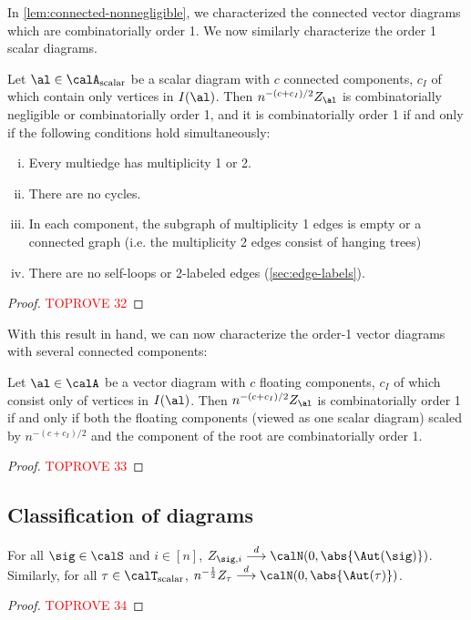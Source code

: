 \documentclass[12pt]{article}
\newcommand{\scalar}{\textnormal{scalar}}
\begin{document}
In \cref{lem:connected-nonnegligible}, we characterized the connected vector diagrams which are combinatorially order 1.
We now similarly characterize the order 1 scalar diagrams.
\begin{lemma}\label{lem:scalar-nonnegligible}
    Let $\al \in \calA_{\scalar}$ be a scalar diagram with $c$ connected components, $c_I$ of which contain only vertices in $I(\al)$.
Then 
$n^{-(c+c_I)/2}Z_\al$ is combinatorially negligible or combinatorially order 1, and it is combinatorially order 1 if and only if the following conditions hold simultaneously:
\begin{enumerate}[(i)]
    \item Every multiedge has multiplicity 1 or 2.
    \item There are no cycles.
    \item In each component, the subgraph of multiplicity 1 edges is empty or a connected graph
    (i.e. the multiplicity 2 edges consist of hanging trees)
    \item There are no self-loops or 2-labeled edges (\cref{sec:edge-labels}).
\end{enumerate}
\end{lemma}
\begin{proof}\textcolor{red}{TOPROVE 32}\end{proof}

With this result in hand, we can now characterize the order-1 vector diagrams with several connected components:

\begin{corollary}\label{cor:classify-full}
    Let $\al \in \calA$ be a vector diagram with $c$ floating components, $c_I$
of which consist only of vertices in $I(\al)$. Then $n^{-(c+c_I)/2}Z_\al$ is combinatorially order 1 if and only if both the floating components (viewed as one scalar diagram) scaled by $n^{-(c+c_I)/2}$ and the component of the root are combinatorially order 1.
\end{corollary}
\begin{proof}\textcolor{red}{TOPROVE 33}\end{proof} 
\subsection{Classification of diagrams}
\label{sec:diagram-classification-proof}

\begin{lemma}\label{lem:Ztau-normal}
    For all $\sig \in \calS$ and $i\in [n]$, $Z_{\sig, i} \overset{d}{\longrightarrow} \calN(0, \abs{\Aut(\sig)})$. Similarly, for all $\tau\in\calT_{\scalar}$, $n^{-\frac 1 2} Z_\tau\overset{d}{\longrightarrow} \calN(0, \abs{\Aut(\tau)})$.
\end{lemma}
\begin{proof}\textcolor{red}{TOPROVE 34}\end{proof}
\end{document}
